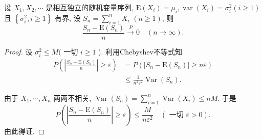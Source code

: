 \begin{theorem}[Chebyshev大数律] 
    设 $X_1, X_2, \cdots$ 是相互独立的随机变量序列, $\mathrm{E}\left(X_i\right)=\mu_i, \operatorname{var}\left(X_i\right)=\sigma_i^2(i \geqslant 1)$ 且 $\left\{\sigma_i^2, i \geqslant 1\right\}$ 有界, 设 $S_n=\sum_{i=1}^n X_i$ $(n \geqslant 1)$, 则
$$
\frac{S_n-\mathrm{E}\left(S_n\right)}{n} \stackrel{P}{\longrightarrow} 0 \quad(n \rightarrow \infty) .
$$
\end{theorem}

\begin{proof}
    设 $\sigma_i^2 \leqslant M($ 一切 $i \geqslant 1$ ). 利用Chebyshev不等式知
$$
\begin{aligned}
P\left(\left|\frac{S_n-\mathrm{E}\left(S_n\right)}{n}\right| \geqslant \varepsilon\right) & =P\left(\left|S_n-\mathrm{E}\left(S_n\right)\right| \geqslant n \varepsilon\right) \\
& \leqslant \frac{1}{n^2 \varepsilon^2} \operatorname{Var}\left(S_n\right) .
\end{aligned}
$$

由于 $X_1, \cdots, X_n$ 两两不相关, $\operatorname{Var}\left(S_n\right)=\sum_{i=1}^n \operatorname{Var}\left(X_i\right) \leqslant n M$. 于是
$$
P\left(\left|\frac{S_n-\mathrm{E}\left(S_n\right)}{n}\right| \geqslant \varepsilon\right) \leqslant \frac{M}{n \varepsilon^2} \quad(\text { 一切 } \varepsilon>0) .
$$
由此得证. 

\end{proof}




